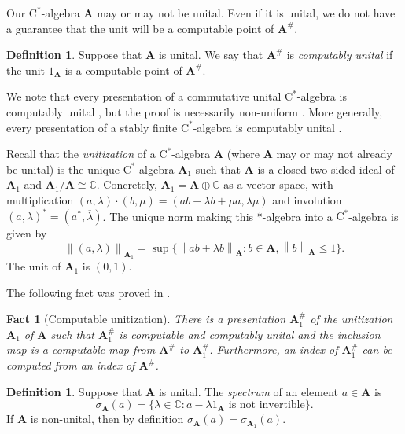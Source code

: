 \documentclass{amsart}
\newcommand{\norm}[1]{\left\| #1 \right\|}
\newcommand{\boldA}{\mathbf{A}}
\newcommand{\cstar}{$\mathrm{C}^*$}
\theoremstyle{plain}
\newtheorem{fact}[theorem]{Fact}
\theoremstyle{definition}
\newtheorem{definition}[theorem]{Definition}
\numberwithin{equation}{section}
\begin{document}
Our \cstar-algebra $\boldA$ may or may not be unital.  Even if it is unital, we do not have a guarantee that the unit will be a computable point of $\boldA^\#$.

\begin{definition}
Suppose that $\boldA$ is unital.  We say that $\boldA^\#$ is \emph{computably unital} if the unit $1_\boldA$ is a computable point of $\boldA^\#$.
\end{definition}

We note that every presentation of a commutative unital \cstar-algebra is computably unital \cite[Theorem 4.1]{Gelfand}, but the proof is necessarily non-uniform \cite[Theorem 5.3]{McNicholl.2025}.  More generally, every presentation of a stably finite \cstar-algebra is computably unital \cite[Proposition 4.5]{UHFPaper}.

Recall that the \emph{unitization} of a \cstar-algebra $\boldA$ (where $\boldA$ may or may not already be unital) is the unique \cstar-algebra $\boldA_1$ such that $\boldA$ is a closed two-sided ideal of $\boldA_1$ and $\boldA_1/\boldA \cong \mathbb{C}$.  Concretely, $\boldA_1 = \boldA \oplus \mathbb{C}$ as a vector space, with multiplication $(a, \lambda)\cdot(b, \mu) = (ab+\lambda b + \mu a, \lambda\mu)$ and involution $(a, \lambda)^* = (a^*, \overline{\lambda})$.  The unique norm making this *-algebra into a \cstar-algebra is given by
\[\norm{(a, \lambda)}_{\boldA_1} = \sup\{\norm{ab+\lambda b}_{\boldA} : b \in \boldA, \norm{b}_\boldA \leq 1\}.\]
The unit of $\boldA_1$ is $(0, 1)$.

The following fact was proved in \cite[Proposition 2.21]{UHFPaper}.

\begin{fact}[Computable unitization]\label{prop:CompUnit}
There is a presentation $\boldA^\#_1$ of the unitization $\boldA_1$ of $\boldA$ such that $\boldA^\#_1$ is computable and computably unital and the inclusion map is a computable map from $\boldA^\#$ to $\boldA_1^\#$.  Furthermore, an index of $\boldA^\#_1$ can be computed from an index of $\boldA^\#$.
\end{fact}

\begin{definition}
Suppose that $\boldA$ is unital. The \emph{spectrum} of an element $a \in \boldA$ is
\[\sigma_\boldA(a) = \{\lambda \in \mathbb{C} : a - \lambda1_\boldA \text{ is not invertible}\}.\]
If $\boldA$ is non-unital, then by definition $\sigma_\boldA(a) = \sigma_{\boldA_1}(a)$.
\end{definition}
\end{document}
